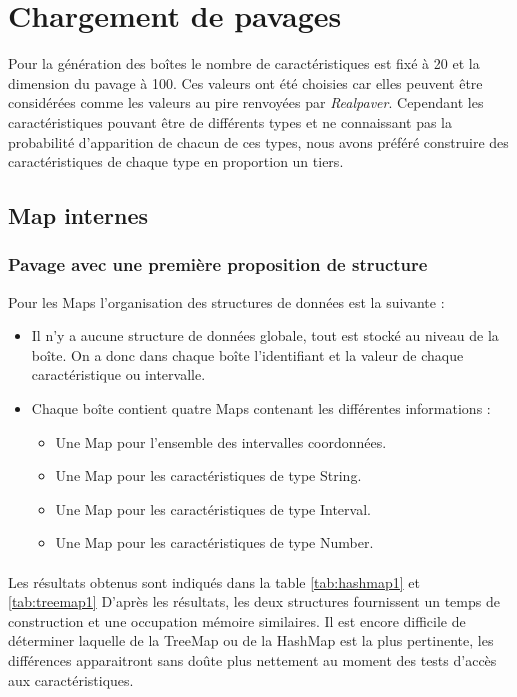\section{Chargement de pavages}
\label{chap:Chargement}
Pour la génération des boîtes le nombre de caractéristiques est fixé à 20 et la dimension du pavage à 100. Ces valeurs ont été choisies car elles peuvent être considérées comme les valeurs au pire renvoyées par \emph{Realpaver}. Cependant les caractéristiques pouvant être de différents types et ne connaissant pas la probabilité d'apparition de chacun de ces types, nous avons préféré construire des caractéristiques de chaque type en proportion un tiers. 

\subsection{Map internes}

\subsubsection{Pavage avec une première proposition de structure}
Pour les Maps l'organisation des structures de données est la suivante :
\begin{itemize}
\item Il n'y a aucune structure de données globale, tout est stocké au niveau de la boîte. On a donc dans chaque boîte l'identifiant et la valeur de chaque caractéristique ou intervalle.
 \item Chaque boîte contient quatre Maps contenant les différentes informations :
\begin{itemize}
 \item Une Map pour l'ensemble des intervalles coordonnées.
\item Une Map pour les caractéristiques de type String.
\item Une Map pour les caractéristiques de type Interval.
\item Une Map pour les caractéristiques de type Number.
\end{itemize}
\end{itemize}

\paragraph{}Les résultats obtenus sont indiqués dans la table \ref{tab:hashmap1} et \ref{tab:treemap1}
D'après les résultats, les deux structures fournissent un temps de construction et une occupation mémoire similaires.
Il est encore difficile de déterminer laquelle de la TreeMap ou de la HashMap est la plus pertinente, les différences apparaitront sans doûte plus nettement au moment des tests d'accès aux caractéristiques. 


